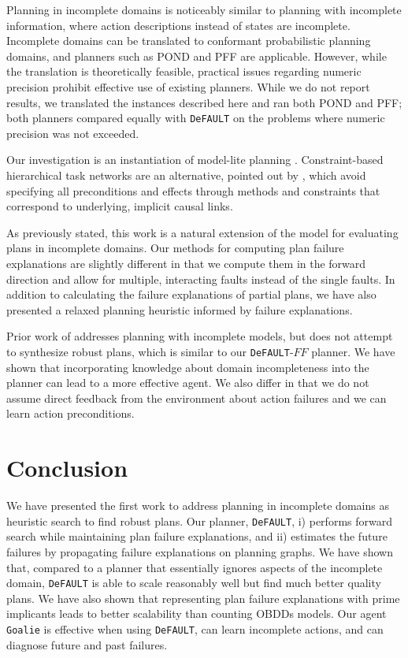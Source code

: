 \documentclass{article}
\def\citep#1{\cite{#1}} \def\citet#1{\citeA{#1}}
\def\FFRISKY{{\tt DeFAULT}}
\def\goalie{{\tt Goalie}}
\begin{document}
Planning in incomplete domains is noticeably similar to planning with incomplete
information, where action descriptions instead of states are incomplete. 
Incomplete domains can be translated to conformant probabilistic planning
domains, and planners such as POND \citep{aij-mclug} and PFF \citep{pff} are
applicable.  However, while the translation is theoretically feasible, practical
issues regarding numeric precision prohibit effective use of existing planners. 
While we do not report results, we translated the instances described here and
ran both POND and PFF; both planners compared equally with \FFRISKY{} on the
problems where numeric precision was not exceeded.

Our investigation is an instantiation of model-lite planning \citep{modellite}.  Constraint-based hierarchical task networks are an alternative, pointed out by \citet{modellite},  which avoid specifying all preconditions and effects through methods and constraints that correspond to underlying, implicit causal links.

As previously stated, this work is a natural extension of the \citet{Garland02} model for evaluating plans in incomplete domains.  Our methods for computing plan failure explanations are slightly different in that we compute them in the forward direction and allow for multiple, interacting faults instead of the single faults.  In addition to calculating the failure explanations of partial plans, we have also presented a relaxed planning heuristic informed by failure explanations.

Prior work of \citet{DBLP:conf/aips/ChangA06} addresses planning with incomplete models, but does not attempt to synthesize robust plans, which is similar to our \FFRISKY{}-$FF$ planner.  We have shown that incorporating knowledge about domain incompleteness into the planner can lead to a more effective agent.  We also differ in that we do not assume direct feedback from the environment about action failures and we can learn action preconditions.

\section{Conclusion}

We have presented the first work to address planning in incomplete domains as
heuristic search to find robust plans.  Our planner, \FFRISKY{}, i) performs
forward search while maintaining plan failure explanations, and ii) estimates
the future failures by propagating failure explanations on planning graphs.  We
have shown that, compared to a planner that essentially ignores aspects of the
incomplete domain, \FFRISKY{} is able to scale reasonably well but find much
better quality plans.  We have also shown that representing plan failure
explanations with prime implicants leads to better scalability than counting
OBDDs models.  Our agent \goalie{} is  effective when using \FFRISKY{}, can learn  incomplete
actions, and can diagnose future and past failures.
\end{document}
